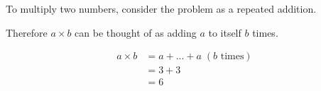 \documentclass{report}
\begin{document}
To multiply two numbers, consider the problem as a repeated addition.

Therefore $a\times b$ can be thought of as adding $a$ to itself $b$ times.

\begin{align*}
a \times b &= a + ... + a \; (b\text{ times}) \\
&= 3+3 \\
&= 6
\end{align*}
\end{document}
